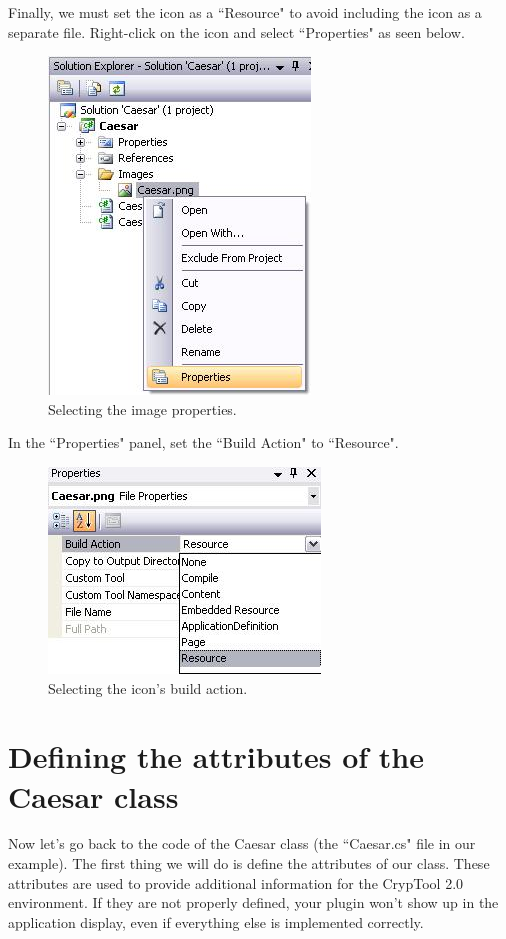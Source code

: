 Finally, we must set the icon as a ``Resource" to avoid including the icon as a separate file. Right-click on the icon and select ``Properties" as seen below.

\begin{figure}[h!]
	\centering
		\includegraphics{figures/icon_properties.jpg}
	\caption{Selecting the image properties.}
	\label{fig:icon_properties}
\end{figure}

In the ``Properties" panel, set the ``Build Action" to ``Resource".

\begin{figure}[h!]
	\centering
		\includegraphics{figures/icon_build_action.jpg}
	\caption{Selecting the icon's build action.}
	\label{fig:icon_build_action}
\end{figure}
\clearpage

\section{Defining the attributes of the Caesar class}
\label{sec:DefiningTheAttributesOfTheCaesarClass}

Now let's go back to the code of the Caesar class (the ``Caesar.cs" file in our example). The first thing we will do is define the attributes of our class. These attributes are used to provide additional information for the CrypTool 2.0 environment. If they are not properly defined, your plugin won't show up in the application display, even if everything else is implemented correctly.

